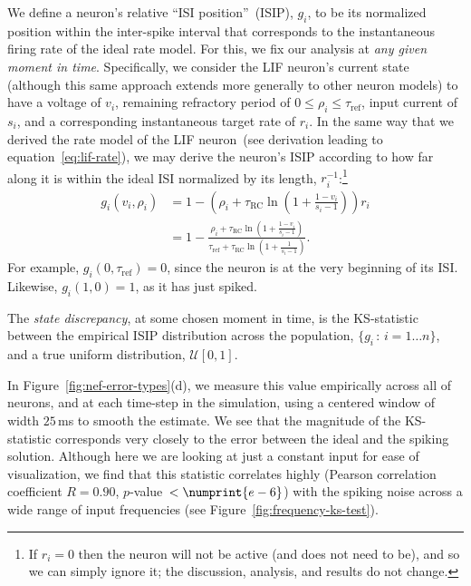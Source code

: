 We define a neuron's relative ``ISI position''~(ISIP), $g_i$, to be its normalized position within the inter-spike interval that corresponds to the instantaneous firing rate of the ideal rate model.
For this, we fix our analysis at \emph{any given moment in time}.
Specifically, we consider the LIF neuron's current state (although this same approach extends more generally to other neuron models) to have a voltage of $v_i$, remaining refractory period of $0 \le \rho_i \le \tau_\text{ref}$, input current of $s_i$, and a corresponding instantaneous target rate of $r_i$.
In the same way that we derived the rate model of the LIF neuron~(see derivation leading to equation~\ref{eq:lif-rate}), we may derive the neuron's ISIP according to how far along it is within the ideal ISI normalized by its length, $r_i^{-1}$:\footnote{
If $r_i = 0$ then the neuron will not be active (and does not need to be), and so we can simply ignore it; the discussion, analysis, and results do not change.}
\begin{equation} \label{eq:lif-isip}
\begin{aligned}
g_i(v_i, \rho_i) &= 1 - \left( \rho_i + \tau_\text{RC} \ln \left( 1 + \frac{1 - v_i}{s_i - 1} \right) \right) r_i \\
&= 1 - \frac{\rho_i + \tau_\text{RC} \ln \left( 1 + \frac{1 - v_i}{s_i - 1} \right)}{\tau_\text{ref} + \tau_\text{RC} \ln \left( 1 + \frac{1}{s_i - 1} \right)} \text{.}
\end{aligned}
\end{equation}
For example, $g_i(0, \tau_\text{ref}) = 0$, since the neuron is at the very beginning of its ISI.
Likewise, $g_i(1, 0) = 1$, as it has just spiked.

\begin{definition} \label{def:state-discrepancy}
The \emph{state discrepancy}, at some chosen moment in time, is the KS-statistic between the empirical ISIP distribution across the population, $\{g_i \, : \, i = 1 \ldots n\}$, and a true uniform distribution, $\mathcal{U}[0, 1]$.
\end{definition}

In Figure~\ref{fig:nef-error-types}(d), we measure this value empirically across all of neurons, and at each time-step in the simulation, using a centered window of width $25$\,ms to smooth the estimate.
We see that the magnitude of the KS-statistic corresponds very closely to the error between the ideal and the spiking solution.
Although here we are looking at just a constant input for ease of visualization, we find that this statistic correlates highly (Pearson correlation coefficient $R = 0.90$, $p$-value~$< \numprint{e-6}$) with the spiking noise across a wide range of input frequencies (see Figure~\ref{fig:frequency-ks-test}).

